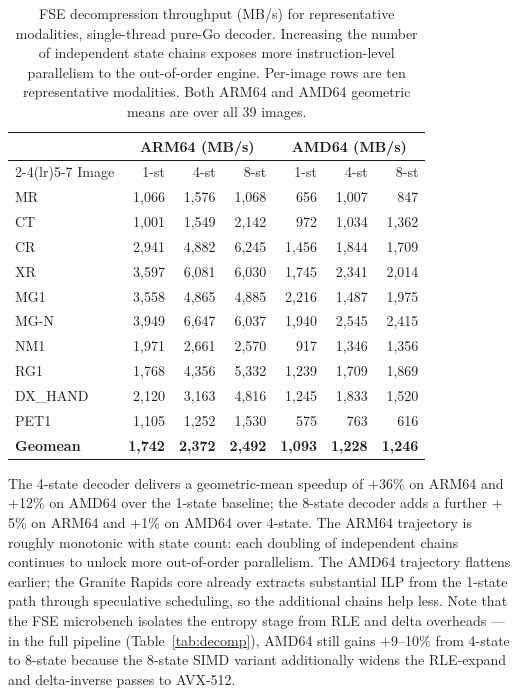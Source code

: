 \documentclass[journal]{IEEEtran}
\begin{document}
\begin{table}[htbp]
\centering
\caption{FSE decompression throughput (MB/s) for representative modalities,
single-thread pure-Go decoder. Increasing the number of independent state
chains exposes more instruction-level parallelism to the out-of-order
engine. Per-image rows are ten representative modalities. Both ARM64 and AMD64
geometric means are over all 39 images.}
\label{tab:fse-combined}
\scriptsize
\setlength{\tabcolsep}{4pt}
\begin{tabular}{lrrrrrr}
\toprule
 & \multicolumn{3}{c}{ARM64 (MB/s)} & \multicolumn{3}{c}{AMD64 (MB/s)} \\
\cmidrule(lr){2-4}\cmidrule(lr){5-7}
Image & 1-st & 4-st & 8-st & 1-st & 4-st & 8-st \\
\midrule
MR       & 1{,}066 & 1{,}576 & 1{,}068 & 656 & 1{,}007 & 847 \\
CT       & 1{,}001 & 1{,}549 & 2{,}142 & 972 & 1{,}034 & 1{,}362 \\
CR       & 2{,}941 & 4{,}882 & 6{,}245 & 1{,}456 & 1{,}844 & 1{,}709 \\
XR       & 3{,}597 & 6{,}081 & 6{,}030 & 1{,}745 & 2{,}341 & 2{,}014 \\
MG1      & 3{,}558 & 4{,}865 & 4{,}885 & 2{,}216 & 1{,}487 & 1{,}975 \\
MG-N     & 3{,}949 & 6{,}647 & 6{,}037 & 1{,}940 & 2{,}545 & 2{,}415 \\
NM1      & 1{,}971 & 2{,}661 & 2{,}570 & 917 & 1{,}346 & 1{,}356 \\
RG1      & 1{,}768 & 4{,}356 & 5{,}332 & 1{,}239 & 1{,}709 & 1{,}869 \\
DX\_HAND & 2{,}120 & 3{,}163 & 4{,}816 & 1{,}245 & 1{,}833 & 1{,}520 \\
PET1     & 1{,}105 & 1{,}252 & 1{,}530 & 575 & 763 & 616 \\
\midrule
\textbf{Geomean} & \textbf{1{,}742} & \textbf{2{,}372} & \textbf{2{,}492} & \textbf{1{,}093} & \textbf{1{,}228} & \textbf{1{,}246} \\
\bottomrule
\end{tabular}
\end{table}

The 4-state decoder delivers a geometric-mean speedup of $+$36\% on
ARM64 and $+$12\% on AMD64 over the 1-state baseline; the 8-state
decoder adds a further $+$5\% on ARM64 and $+$1\% on AMD64 over
4-state. The ARM64 trajectory is roughly monotonic with state count:
each doubling of independent chains continues to unlock more
out-of-order parallelism. The AMD64 trajectory flattens earlier; the
Granite Rapids core already extracts substantial ILP from the 1-state
path through speculative scheduling, so the additional chains help
less. Note that the FSE microbench isolates the entropy stage from RLE
and delta overheads --- in the full pipeline
(Table~\ref{tab:decomp}), AMD64 still gains $+$9--10\% from 4-state
to 8-state because the 8-state SIMD variant additionally widens the
RLE-expand and delta-inverse passes to AVX-512.
\end{document}
